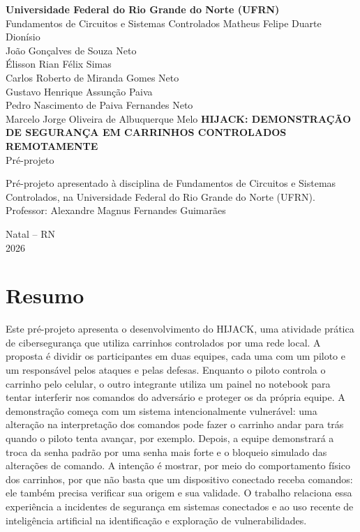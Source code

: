 \documentclass[12pt,a4paper]{article}
\newcommand{\instituicao}{Universidade Federal do Rio Grande do Norte (UFRN)}
\newcommand{\disciplina}{Fundamentos de Circuitos e Sistemas Controlados}
\newcommand{\titulo}{HIJACK: demonstração de segurança em carrinhos controlados remotamente}
\newcommand{\orientador}{Alexandre Magnus Fernandes Guimarães}
\newcommand{\cidade}{Natal -- RN}
\newcommand{\ano}{2026}
\begin{document}
\begin{titlepage}
\centering
{\large\bfseries \instituicao}\\[0.3cm]
{\large \disciplina}
\vfill
{\normalsize
Matheus Felipe Duarte Dionísio\\
João Gonçalves de Souza Neto\\
Élisson Rian Félix Simas\\
Carlos Roberto de Miranda Gomes Neto\\
Gustavo Henrique Assunção Paiva\\
Pedro Nascimento de Paiva Fernandes Neto\\
Marcelo Jorge Oliveira de Albuquerque Melo}
\vfill
{\Large\bfseries \MakeUppercase{\titulo}}\\[0.6cm]
{\large Pré-projeto}
\vfill
\begin{flushright}
\begin{minipage}{0.55\textwidth}
\singlespacing
Pré-projeto apresentado à disciplina de \disciplina{},
na \instituicao.\\[0.3cm]
Professor: \orientador
\end{minipage}
\end{flushright}
\vfill
{\large \cidade\\ \ano}
\end{titlepage}

\section*{Resumo}
Este pré-projeto apresenta o desenvolvimento do HIJACK, uma atividade prática de
cibersegurança que utiliza carrinhos controlados por uma rede
local. A proposta é dividir os participantes em duas equipes, cada uma com um
piloto e um responsável pelos ataques e pelas defesas. Enquanto o piloto
controla o carrinho pelo celular, o outro integrante utiliza um painel no
notebook para tentar interferir nos comandos do adversário e proteger os da
própria equipe. A demonstração começa com um sistema intencionalmente
vulnerável: uma alteração na interpretação dos comandos pode fazer o carrinho
andar para trás quando o piloto tenta avançar, por exemplo. Depois, a equipe demonstrará a troca da senha padrão por uma senha mais forte e o bloqueio simulado das alterações de comando.
A intenção é mostrar, por meio do comportamento físico dos carrinhos, por que
não basta que um dispositivo conectado receba comandos: ele também precisa
verificar sua origem e sua validade. O trabalho relaciona essa experiência a
incidentes de segurança em sistemas conectados e ao uso recente de inteligência
artificial na identificação e exploração de vulnerabilidades.
\end{document}
